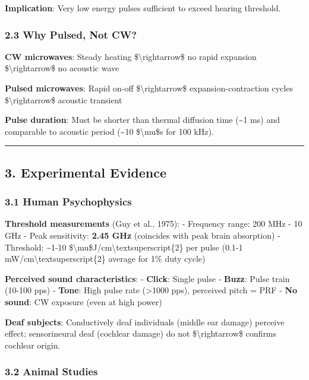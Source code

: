 \textbf{Implication}: Very low energy pulses sufficient to exceed
hearing threshold.

\subsubsection{2.3 Why Pulsed, Not CW?}\label{why-pulsed-not-cw}

\textbf{CW microwaves}: Steady heating \$\textbackslash rightarrow\$ no
rapid expansion \$\textbackslash rightarrow\$ no acoustic wave

\textbf{Pulsed microwaves}: Rapid on-off \$\textbackslash rightarrow\$
expansion-contraction cycles \$\textbackslash rightarrow\$ acoustic
transient

\textbf{Pulse duration}: Must be shorter than thermal diffusion time
(\textasciitilde1 ms) and comparable to acoustic period
(\textasciitilde10 \$\textbackslash mu\$s for 100 kHz).

\begin{center}\rule{0.5\linewidth}{0.5pt}\end{center}

\subsection{3. Experimental Evidence}\label{experimental-evidence}

\subsubsection{3.1 Human Psychophysics}\label{human-psychophysics}

\textbf{Threshold measurements} (Guy et al., 1975): - Frequency range:
200 MHz - 10 GHz - Peak sensitivity: \textbf{2.45 GHz} (coincides with
peak brain absorption) - Threshold: \textasciitilde1-10
\$\textbackslash mu\$J/cm\textbackslash textsuperscript\{2\} per pulse
(0.1-1 mW/cm\textbackslash textsuperscript\{2\} average for 1\% duty
cycle)

\textbf{Perceived sound characteristics}: - \textbf{Click}: Single pulse
- \textbf{Buzz}: Pulse train (10-100 pps) - \textbf{Tone}: High pulse
rate (\textgreater1000 pps), perceived pitch = PRF - \textbf{No sound}:
CW exposure (even at high power)

\textbf{Deaf subjects}: Conductively deaf individuals (middle ear
damage) perceive effect; sensorineural deaf (cochlear damage) do not
\$\textbackslash rightarrow\$ confirms cochlear origin.

\subsubsection{3.2 Animal Studies}\label{animal-studies}


